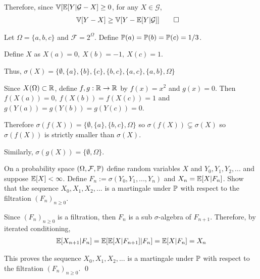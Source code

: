\documentclass[10pt]{article}
\begin{document}
\begin{solution}[Solution]
Therefore, since \( \mathbb{V}[\mathbb{E}[Y|\mathcal{G}-X]\geq 0 \), for any \( X\in\mathcal{G} \), 
\begin{align*}
    \mathbb{V}[Y-X] &\geq \mathbb{V}[Y-\EE[Y|\mathcal{G}]] \tag*{\qed}
\end{align*}


Let \( \Omega = \{a,b,c\} \) and \( \mathcal{F}=2^\Omega \). Define \( \mathbb{P}(a)=\mathbb{P}(b)=\mathbb{P}(c)=1/3 \).

Define \( X \) as \( X(a)=0,~ X(b)=-1,~ X(c)=1 \). 

Thus, \( \sigma(X) = \{\emptyset, \{a\}, \{b\}, \{c\}, \{b,c\}, \{a,c\}, \{a,b\}, \Omega \} \)

Since \( X(\Omega)\subset\mathbb{R} \), define \( f,g:\mathbb{R}\to\mathbb{R} \) by \( f(x)=x^2 \) and \( g(x) = 0 \).
Then \( f(X(a))=0,~ f(X(b)) = f(X(c)) = 1 \) and \( g(Y(a))=g(Y(b))=g(Y(c))=0 \).

Therefore \( \sigma(f(X)) = \{ \emptyset, \{a\},\{b,c\} ,\Omega \} \) so \( \sigma(f(X))\subsetneq \sigma(X) \) so \( \sigma(f(X)) \) is strictly smaller than \( \sigma(X) \).

Similarly, \( \sigma(g(X)) = \{\emptyset, \Omega\}  \).
\end{solution}

\begin{problem}[Exercise 2.4]
On a probability space \( (\Omega,\mathcal{F},\mathbb{P}) \) define random variables \( X \) and \( Y_0,Y_1,Y_2, ... \) and suppose \( \mathbb{E}[X]<\infty \). Define \( F_n:=\sigma(Y_0,Y_1,...,Y_n) \) and \(X_n=\mathbb{E}[X|F_n] \). Show that the sequence \(X_0,X_1,X_2,... \) is a martingale under \( \mathbb{P} \) with respect to the filtration \( (F_n)_{n\geq 0}\).
\end{problem}

\begin{solution}[Solution]

Since \( (F_n)_{n\geq0} \) is a filtration, then \( F_n \) is a sub \( \sigma \)-algebra of \( F_{n+1} \). Therefore, by iterated conditioning,
\begin{align*}
    \mathbb{E}[X_{n+1} | F_n] = \mathbb{E}[\mathbb{E}[X | F_{n+1}]| F_n] = \mathbb{E}[X | F_n] = X_n
\end{align*}

This proves the sequence \( X_0, X_1, X_2, ... \) is a martingale under \( \mathbb{P} \) with respect to the filtration \( (F_n)_{n\geq 0} \). \qed
\end{solution}
\end{document}
